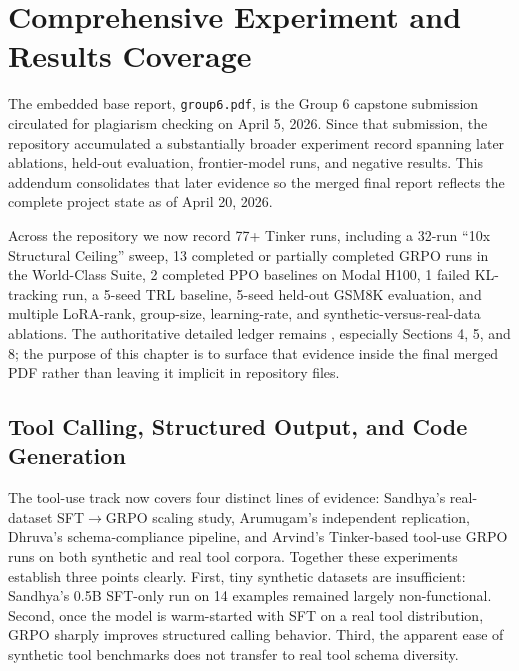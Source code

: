\chapter*{Comprehensive Experiment and Results Coverage}

The embedded base report, \texttt{group6.pdf}, is the Group 6 capstone submission
circulated for plagiarism checking on April 5, 2026. Since that submission, the
repository accumulated a substantially broader experiment record spanning later
ablations, held-out evaluation, frontier-model runs, and negative results. This
addendum consolidates that later evidence so the merged final report reflects the
complete project state as of April 20, 2026.

Across the repository we now record 77+ Tinker runs, including a 32-run
``10x Structural Ceiling'' sweep, 13 completed or partially completed GRPO runs
in the World-Class Suite, 2 completed PPO baselines on Modal H100, 1 failed
KL-tracking run, a 5-seed TRL baseline, 5-seed held-out GSM8K evaluation, and
multiple LoRA-rank, group-size, learning-rate, and synthetic-versus-real-data
ablations. The authoritative detailed ledger remains
, especially Sections 4, 5, and 8;
the purpose of this chapter is to surface that evidence inside the final merged
PDF rather than leaving it implicit in repository files.

\section*{Tool Calling, Structured Output, and Code Generation}

The tool-use track now covers four distinct lines of evidence: Sandhya's
real-dataset SFT$\rightarrow$GRPO scaling study, Arumugam's independent
replication, Dhruva's schema-compliance pipeline, and Arvind's Tinker-based
tool-use GRPO runs on both synthetic and real tool corpora. Together these
experiments establish three points clearly. First, tiny synthetic datasets are
insufficient: Sandhya's 0.5B SFT-only run on 14 examples remained largely
non-functional. Second, once the model is warm-started with SFT on a real tool
distribution, GRPO sharply improves structured calling behavior. Third, the
apparent ease of synthetic tool benchmarks does not transfer to real tool
schema diversity.

